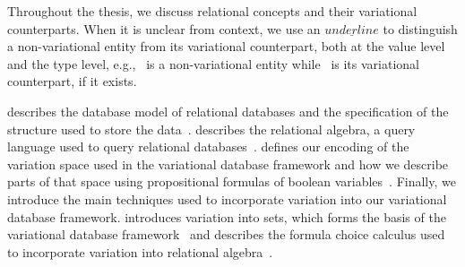 %
Throughout the thesis, we discuss relational concepts and their
variational counterparts. 
When it is unclear from context, we use
an $\underline{underline}$ to distinguish a non-variational entity
from its variational counterpart, 
both at the value level and the type level,
e.g., \pElem\ is a 
non-variational entity while \elem\ is its variational counterpart,
if it exists.


%
 describes the database model of relational databases and 
the specification of
the structure used to store the data~\cite{AliceBook}. 
 describes the relational algebra, a query language used to query relational databases~\cite{AliceBook}.
%
 defines our encoding of the variation space used in the 
variational database framework and how we describe parts of that space using propositional formulas of boolean variables~\cite{ATW18poly,ATW17dbpl}.
%
Finally, we introduce the main techniques used to incorporate variation into our variational 
database framework.
 introduces variation into sets, which forms the basis of the variational database
framework~\cite{EWC13fosd,Walk14onward,ATW17dbpl} 
and  describes the formula choice calculus used to incorporate 
variation into relational algebra~\cite{HW16fosd}.



%




